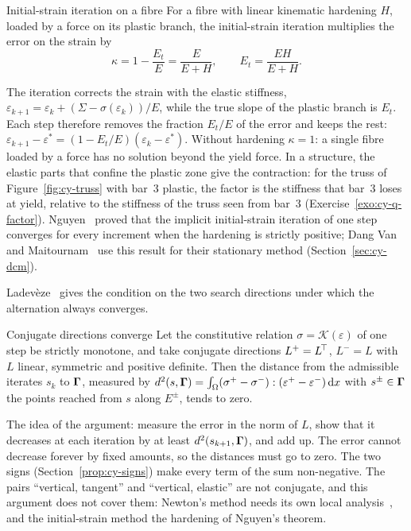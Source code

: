 \begin{gbox}{Initial-strain iteration on a fibre}\label{prop:cy-factor}
For a fibre with linear kinematic hardening $H$, loaded by a force on its
plastic branch, the initial-strain iteration multiplies the error on the
strain by
\[
  \kappa=1-\frac{E_t}{E}=\frac{E}{E+H},\qquad E_t=\frac{EH}{E+H}.
\]
\end{gbox}
\noindent The iteration corrects the strain with the elastic stiffness,
$\varepsilon_{k+1}=\varepsilon_k+(\Sigma-\sigma(\varepsilon_k))/E$, while the
true slope of the plastic branch is $E_t$. Each step therefore removes the
fraction $E_t/E$ of the error and keeps the rest:
$\varepsilon_{k+1}-\varepsilon^\ast=(1-E_t/E)(\varepsilon_k-\varepsilon^\ast)$.
Without hardening $\kappa=1$: a single fibre loaded by a force has no solution
beyond the yield force. In a structure, the elastic parts that confine the
plastic zone give the contraction: for the truss of Figure~\ref{fig:cy-truss}
with bar~3 plastic, the factor is the stiffness that bar~3 loses at yield,
relative to the stiffness of the truss seen from bar~3
(Exercise~\ref{exo:cy-q-factor}). Nguyen~\cite{Nguyen1977} proved that the
implicit initial-strain iteration of one step converges for every increment
when the hardening is strictly positive; Dang Van and
Maitournam~\cite[Rem.~4.1]{DangVanMaitournam1993} use this result for their
stationary method (Section~\ref{sec:cy-dcm}).

Ladev\`eze~\cite[Sec.~3.3.6]{LadevezeNCSM} gives the condition on the two
search directions under which the alternation always converges.
\begin{gbox}{Conjugate directions converge}\label{thm:cy-conjugate}
Let the constitutive relation $\sigma=\mathcal K(\varepsilon)$ of one step be
strictly monotone, and take conjugate directions $L^+=L^{\!\top}$, $L^-=L$ with $L$
linear, symmetric and positive definite. Then the distance from the admissible
iterates $s_k$ to $\boldsymbol{\Gamma}$, measured by
$d^2(s,\boldsymbol{\Gamma})=\int_\Omega(\sigma^+-\sigma^-):(\varepsilon^+-\varepsilon^-)\,\mathrm{d} x$
with $s^\pm\in\boldsymbol{\Gamma}$ the points reached from $s$ along $E^\pm$, tends to zero.
\end{gbox}
\noindent The idea of the argument: measure the error in the norm of $L$,
show that it decreases at each iteration by at least $d^2(s_{k+1},\boldsymbol{\Gamma})$,
and add up. The error cannot decrease forever by fixed amounts, so the
distances must go to zero. The two signs (Section~\ref{prop:cy-signs}) make
every term of the sum non-negative. The pairs ``vertical, tangent'' and ``vertical, elastic'' are
not conjugate, and this argument does not cover them: Newton's method needs its
own local analysis~\cite{SauterWieners2011}, and the initial-strain method the
hardening of Nguyen's theorem.

